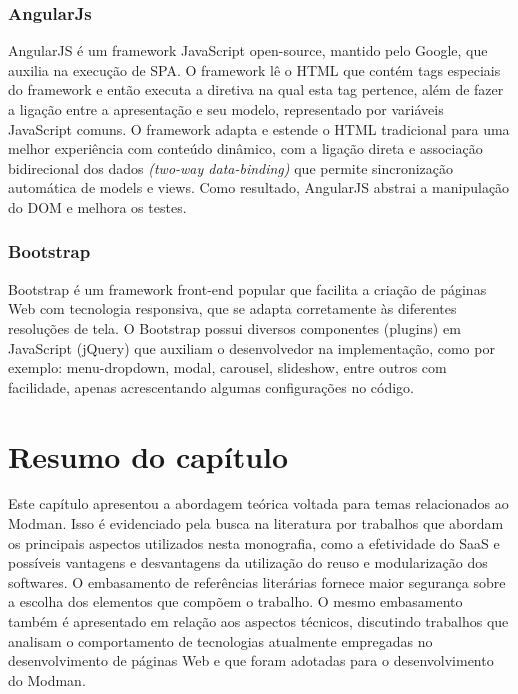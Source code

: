 \subsubsection{AngularJs}


AngularJS é um framework JavaScript open-source, mantido pelo Google, que auxilia na execução de SPA. O framework lê o HTML que contém tags especiais do framework e então executa a diretiva na qual esta tag pertence, além de fazer a ligação entre a apresentação e seu modelo, representado por variáveis JavaScript comuns. O framework adapta e estende o HTML tradicional para uma melhor experiência com conteúdo dinâmico, com a ligação direta e associação bidirecional dos dados \textit{(two-way data-binding)} que permite sincronização automática de models e views. Como resultado, AngularJS abstrai a manipulação do DOM e melhora os testes.


\subsubsection{Bootstrap}


Bootstrap é um framework front-end popular que facilita a criação de páginas Web com tecnologia responsiva, que se adapta corretamente às diferentes resoluções de tela. O Bootstrap possui diversos componentes (plugins) em JavaScript (jQuery) que auxiliam o desenvolvedor na implementação, como por exemplo: menu-dropdown, modal, carousel, slideshow, entre outros com facilidade, apenas acrescentando algumas configurações no código.




\section{Resumo do capítulo}\label{sec:resumo}


Este capítulo apresentou a abordagem teórica voltada para temas relacionados ao Modman. Isso é evidenciado pela busca na literatura por trabalhos que abordam os principais aspectos utilizados nesta monografia, como a efetividade do SaaS e possíveis vantagens e desvantagens da utilização do reuso e modularização dos softwares. O embasamento de referências literárias fornece maior segurança sobre a escolha dos elementos que compõem o trabalho.
O mesmo embasamento também é apresentado em relação aos aspectos técnicos, discutindo trabalhos que analisam o comportamento de tecnologias atualmente empregadas no desenvolvimento de páginas Web e que foram adotadas para o desenvolvimento do Modman.

